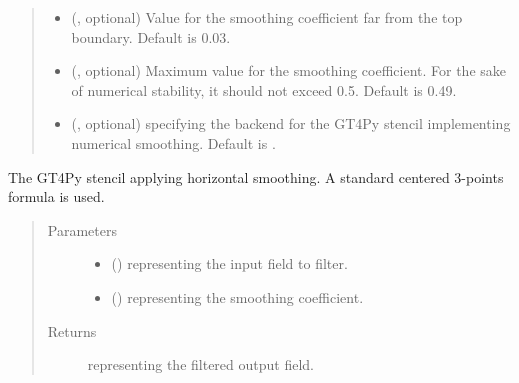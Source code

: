 \documentclass[letterpaper,10pt,english]{sphinxmanual}
\begin{document}
\begin{fulllineitems}
\begin{fulllineitems}
\begin{quote}
\begin{description}
\begin{itemize}
\item {} 
 (, optional) \textendash{} Value for the smoothing coefficient far from the top boundary. Default is 0.03.

\item {} 
 (, optional) \textendash{} Maximum value for the smoothing coefficient. For the sake of numerical stability, it should not
exceed 0.5. Default is 0.49.

\item {} 
 (, optional) \textendash{}  specifying the backend for the GT4Py stencil implementing numerical
smoothing. Default is .

\end{itemize}

\end{description}\end{quote}

\end{fulllineitems}


\begin{fulllineitems}
\label{\detokenize{api:dycore.horizontal_smoothing.HorizontalSmoothingFirstOrderXZ._stencil_defs}}
The GT4Py stencil applying horizontal smoothing. A standard centered 3-points formula is used.
\begin{quote}\begin{description}
\item[{Parameters}] \leavevmode\begin{itemize}
\item {} 
 () \textendash{}  representing the input field to filter.

\item {} 
 () \textendash{}  representing the smoothing coefficient.

\end{itemize}

\item[{Returns}] \leavevmode
{} representing the filtered output field.


\end{description}
\end{quote}
\end{fulllineitems}
\end{fulllineitems}
\end{document}
